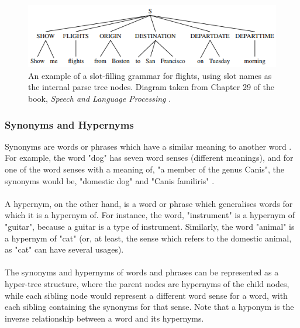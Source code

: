 \documentclass[12pt]{article}
\begin{document}
\begin{center}
\begin{figure}[H]
\begin{center}
  \includegraphics[scale=1]{slot-filling.png}
  \caption{An example of a slot-filling grammar for flights, using slot names as the internal parse tree nodes. Diagram taken from Chapter 29 of the book, \textit{Speech and Language Processing} \cite{RefWorks:107}.}
  \end{center}
\end{figure}
\end{center}


\subsubsection{Synonyms and Hypernyms}

Synonyms are words or phrases which have a similar meaning to another word  \cite{RefWorks:44}. For example, the word "dog" has seven word senses (different meanings), and for one of the word senses with a meaning of, "a member of the genus Canis", the synonyms would be, "domestic dog" and "Canis familiris" \cite{RefWorks:45}.
\\
\\
A hypernym, on the other hand, is a word or phrase which generalises words for which it is a hypernym of. For instance, the word, "instrument" is a hypernym of "guitar", because a guitar is a type of instrument. Similarly, the word "animal" is a hypernym of "cat" (or, at least, the sense which refers to the domestic animal, as "cat" can have several usages).
\\
\\
The synonyms and hypernyms of words and phrases can be represented as a hyper-tree structure, where the parent nodes are hypernyms of the child nodes, while each sibling node would represent a different word sense for a word, with each sibling containing the synonyms for that sense. Note that a hyponym is the inverse relationship between a word and its hypernyms.
\end{document}
